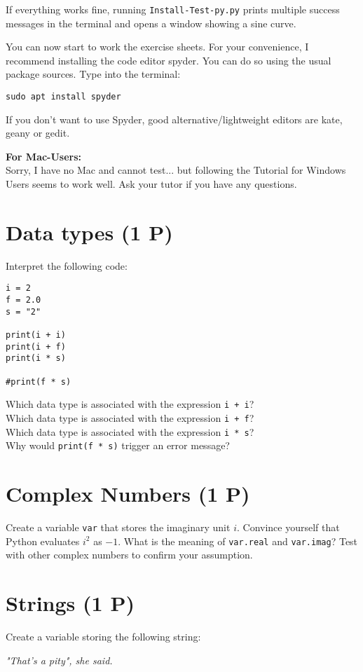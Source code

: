 \documentclass[
	english,
	fontsize=10pt,
	parskip=half,
	titlepage=true,
	DIV=12
]{scrartcl}
\newcommand*{\inPy}[1]{\texttt{#1}}
\begin{document}
If everything works fine, running \texttt{Install-Test-py.py} prints multiple success messages in the terminal and opens a window showing a sine curve.

You can now start to work the exercise sheets. For your convenience, I recommend installing the code editor spyder. You can do so using the usual package sources. Type into the terminal:
\begin{center}
\texttt{sudo apt install spyder}
\end{center}

If you don't want to use Spyder, good alternative/lightweight editors are kate, geany or gedit.

\textbf{For Mac-Users:}\\
Sorry, I have no Mac and cannot test... but following the Tutorial for Windows Users seems to work well. Ask your tutor if you have any questions.


\section{Data types (1 P)}
Interpret the following code:
\begin{verbatim}
i = 2
f = 2.0
s = "2"

print(i + i)
print(i + f)
print(i * s)

#print(f * s)
\end{verbatim}

Which data type is associated with the expression \inPy{i + i}?\\
Which data type is associated with the expression \inPy{i + f}?\\
Which data type is associated with the expression \inPy{i * s}?\\
Why would \inPy{print(f * s)} trigger an error message?

\section{Complex Numbers (1 P)}
Create a variable \texttt{var} that stores the imaginary unit $i$. Convince yourself that Python evaluates $i^2$ as $-1$. What is the meaning of \texttt{var.real} and \texttt{var.imag}? Test with other complex numbers to confirm your assumption.

\section{Strings (1 P)}
Create a variable storing the following string:
\begin{center}
	\emph{"That's a pity", she said.}
\end{center}
\end{document}
